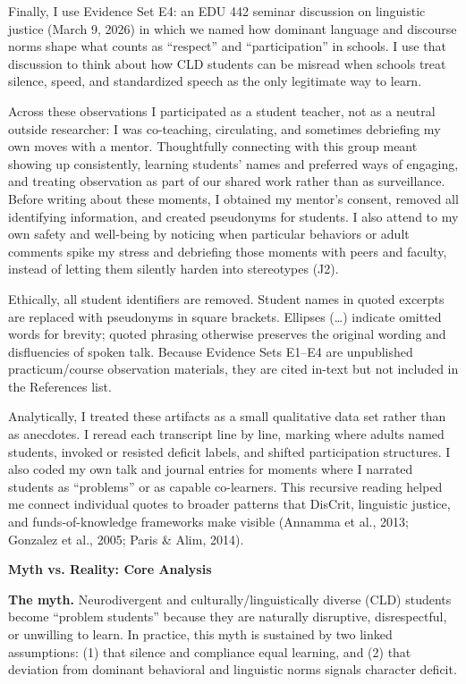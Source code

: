 \documentclass[12pt]{article}
\newcommand{\apaheading}[1]{\begin{center}\textbf{#1}\end{center}}
\newcommand{\EvidenceSet}[1]{\textsc{E#1}}
\newcommand{\JournalArtifact}[1]{\textsc{J#1}}
\begin{document}
Finally, I use Evidence Set \EvidenceSet{4}: an EDU 442 seminar discussion on linguistic justice (March 9, 2026) in which we named how dominant language and discourse norms shape what counts as ``respect'' and ``participation'' in schools. I use that discussion to think about how CLD students can be misread when schools treat silence, speed, and standardized speech as the only legitimate way to learn.

Across these observations I participated as a student teacher, not as a neutral outside researcher: I was co-teaching, circulating, and sometimes debriefing my own moves with a mentor. Thoughtfully connecting with this group meant showing up consistently, learning students' names and preferred ways of engaging, and treating observation as part of our shared work rather than as surveillance. Before writing about these moments, I obtained my mentor's consent, removed all identifying information, and created pseudonyms for students. I also attend to my own safety and well-being by noticing when particular behaviors or adult comments spike my stress and debriefing those moments with peers and faculty, instead of letting them silently harden into stereotypes (\JournalArtifact{2}).

Ethically, all student identifiers are removed. Student names in quoted excerpts are replaced with pseudonyms in square brackets. Ellipses (\ldots{}) indicate omitted words for brevity; quoted phrasing otherwise preserves the original wording and disfluencies of spoken talk. Because Evidence Sets \EvidenceSet{1}--\EvidenceSet{4} are unpublished practicum/course observation materials, they are cited in-text but not included in the References list.

Analytically, I treated these artifacts as a small qualitative data set rather than as anecdotes. I reread each transcript line by line, marking where adults named students, invoked or resisted deficit labels, and shifted participation structures. I also coded my own talk and journal entries for moments where I narrated students as ``problems'' or as capable co-learners. This recursive reading helped me connect individual quotes to broader patterns that DisCrit, linguistic justice, and funds-of-knowledge frameworks make visible (Annamma et al., 2013; Gonzalez et al., 2005; Paris \& Alim, 2014).

\apaheading{Myth vs. Reality: Core Analysis}

\textbf{The myth.} Neurodivergent and culturally/linguistically diverse (CLD) students become ``problem students'' because they are naturally disruptive, disrespectful, or unwilling to learn. In practice, this myth is sustained by two linked assumptions: (1) that silence and compliance equal learning, and (2) that deviation from dominant behavioral and linguistic norms signals character deficit.
\end{document}
